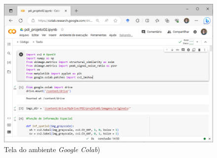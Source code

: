 \begin{figure}[!htpb]
 \centering
 \includegraphics[scale=0.5]{Elementos/Figuras/metodologia-colab.png}
 \caption{Tela do ambiente \textit{Google Colab})}
 \label{imagens-colab}
\end{figure}
